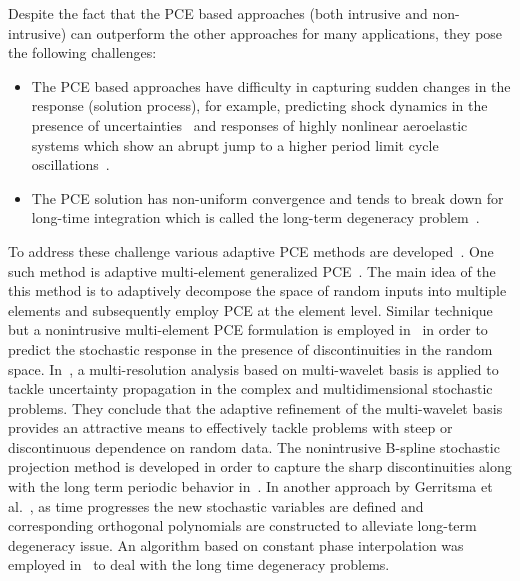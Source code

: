 \documentclass[letter,1p,11pt,oneside,onecolumn,sort&compress]{elsarticle}
\begin{document}
Despite the fact that the PCE based approaches (both intrusive and non-intrusive) can outperform the other approaches for many applications, they pose the following challenges:
\begin{itemize}
\item The PCE based approaches have difficulty in capturing sudden changes in the response (solution process), for example, predicting shock dynamics in the presence of uncertainties~\cite{lin2006predicting,wan2005adaptive,wan2006beyond} and responses of highly nonlinear aeroelastic systems which show an abrupt jump to a higher period limit cycle oscillations~\cite{liu2002non,lin2006predicting,desai2010analysis,desai2013uncertainty}.
\item The PCE solution has non-uniform convergence and tends to break down for long-time integration which is called the long-term degeneracy problem~\cite{lucor2004adaptive,wan2006long,desai2010analysis,desai2013uncertainty}.
\end{itemize}
To address these challenge various adaptive PCE methods are developed~\cite{li1998adaptive,le2004multi,lucor2004adaptive,wan2005adaptive,wan2006beyond}. %
One such method is adaptive multi-element generalized PCE~\cite{wan2005adaptive,wan2006beyond}. The main idea of the this method is to adaptively decompose the space of random inputs into multiple elements and subsequently employ PCE at the element level. Similar technique but a nonintrusive multi-element PCE formulation is employed in~\cite{lucor2004adaptive} in order to predict the stochastic response in the presence of discontinuities in the random space.
In~\cite{le2004multi}, a multi-resolution analysis based on  multi-wavelet basis is applied to tackle uncertainty propagation in the complex and multidimensional stochastic problems. They conclude that the adaptive refinement of the multi-wavelet basis provides an attractive means to effectively tackle problems with steep or discontinuous dependence on random data.
The nonintrusive B-spline stochastic projection method is developed in order to capture the sharp discontinuities along with the long term periodic behavior in~\cite{millman2006uncertainty}. In another approach by Gerritsma et al.~\cite{gerritsma2010time}, as time progresses the new stochastic variables are defined and corresponding orthogonal polynomials are constructed to alleviate long-term degeneracy issue.
An algorithm based on constant phase interpolation was employed in~\cite{witteveen2009efficient,desai2013uncertainty} to deal with the long time degeneracy problems.
\end{document}
